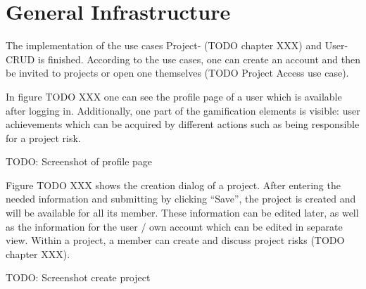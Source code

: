 \section{General Infrastructure}
\label{sec:implementationInfra}

The implementation of the use cases Project- (TODO chapter XXX) and User-CRUD is finished. According to the use cases, one can create an account and then be invited to projects or open one themselves (TODO Project Access use case). 

In figure TODO XXX one can see the profile page of a user which is available after logging in. Additionally, one part of the gamification elements is visible: user achievements which can be acquired by different actions such as being responsible for a project risk.

TODO: Screenshot of profile page

Figure TODO XXX shows the creation dialog of a project. After entering the needed information and submitting by clicking “Save”, the project is created and will be available for all its member. These information can be edited later, as well as the information for the user / own account which can be edited in separate view. Within a project, a member can create and discuss project risks (TODO chapter XXX).

TODO: Screenshot create project


